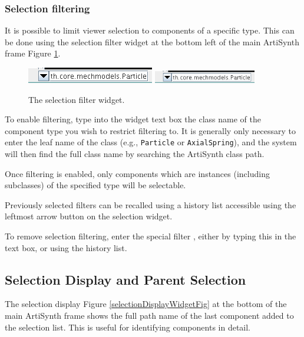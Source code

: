 \documentclass{article}
\begin{document}
\subsubsection{Selection filtering}
\label{selectionFiltersSec}

It is possible to limit viewer selection to components of a specific
type. This can be done using the selection filter widget at the bottom
left of the main ArtiSynth frame Figure \ref{selectionFilterWidgetFig}.

\begin{figure}
\begin{center}
\iflatexml
\includegraphics[]{images/selectionFilterWidget}
\else
\includegraphics[width=0.40\textwidth]{images/selectionFilterWidget}
\fi
\end{center}
\caption{The selection filter widget.}%
\label{selectionFilterWidgetFig}
\end{figure}

To enable filtering, type into the widget text box the class name of
the component type you wish to restrict filtering to. It is generally
only necessary to enter the leaf name of the class (e.g., {\tt Particle}
or {\tt AxialSpring}), and the system will then find the full
class name by searching the ArtiSynth class path.

Once filtering is enabled, only components which are instances
(including subclasses) of the specified type will be selectable.

Previously selected filters can be recalled using a history
list accessible using the leftmost arrow button on the
selection widget.

To remove selection filtering, enter the special filter {\tt *}, either by
typing this in the text box, or using the history list.

\subsection{Selection Display and Parent Selection}
\label{selectionDisplaySec}

The selection display Figure \ref{selectionDisplayWidgetFig} at the bottom of the
main ArtiSynth frame shows the full path name of the last component
added to the selection list. This is useful for identifying components
in detail.
\end{document}

